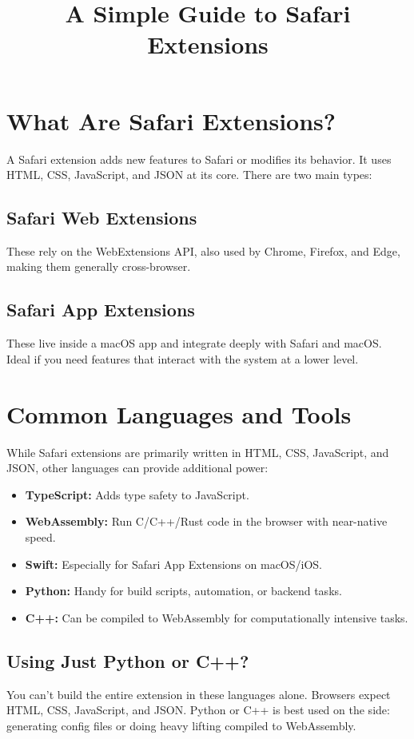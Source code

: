 \documentclass[12pt,a4paper]{article}
\title{\Huge A Simple Guide to Safari Extensions}
\date{}   %
\author{} %
\begin{document}
\maketitle

\section{What Are Safari Extensions?}
A Safari extension adds new features to Safari or modifies its behavior. It uses HTML, CSS, JavaScript, and JSON at its core. There are two main types:

\subsection{Safari Web Extensions}
These rely on the WebExtensions API, also used by Chrome, Firefox, and Edge, making them generally cross-browser.

\subsection{Safari App Extensions}
These live inside a macOS app and integrate deeply with Safari and macOS. Ideal if you need features that interact with the system at a lower level.

\section{Common Languages and Tools}
While Safari extensions are primarily written in HTML, CSS, JavaScript, and JSON, other languages can provide additional power:

\begin{itemize}
    \item \textbf{TypeScript:} Adds type safety to JavaScript.
    \item \textbf{WebAssembly:} Run C/C++/Rust code in the browser with near-native speed.
    \item \textbf{Swift:} Especially for Safari App Extensions on macOS/iOS.
    \item \textbf{Python:} Handy for build scripts, automation, or backend tasks.
    \item \textbf{C++:} Can be compiled to WebAssembly for computationally intensive tasks.
\end{itemize}

\subsection{Using Just Python or C++?}
You can’t build the entire extension in these languages alone. Browsers expect HTML, CSS, JavaScript, and JSON. Python or C++ is best used on the side: generating config files or doing heavy lifting compiled to WebAssembly.
\end{document}
